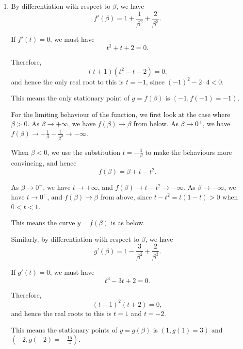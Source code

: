 \Question{\currfilebase}

\begin{enumerate}
    \item By differentiation with respect to \(\beta\), we have
          \[
              f'(\beta) = 1 + \frac{1}{\beta^2} + \frac{2}{\beta^3}.
          \]

          If \(f'(t) = 0\), we must have
          \[
              t^3 + t + 2 = 0.
          \]

          Therefore,
          \[
              (t + 1)(t^2 - t + 2) = 0,
          \]
          and hence the only real root to this is \(t = -1\), since \((-1)^2 - 2 \cdot 4 < 0\).

          This means the only stationary point of \(y = f(\beta)\) is \((-1, f(-1) = -1)\).

          For the limiting behaviour of the function, we first look at the case where \(\beta > 0\). As \(\beta \to +\infty\), we have \(f(\beta) \to \beta\) from below. As \(\beta \to 0^{+}\), we have \(f(\beta) \to -\frac{1}{\beta} - \frac{1}{\beta^2} \to -\infty\).

          When \(\beta < 0\), we use the substitution \(t = -\frac{1}{\beta}\) to make the behaviours more convincing, and hence
          \[
              f(\beta) = \beta + t - t^2.
          \]

          As \(\beta \to 0^{-}\), we have \(t \to +\infty\), and \(f(\beta) \to t - t^2 \to -\infty\). As \(\beta \to -\infty\), we have \(t \to 0^{+}\), and \(f(\beta) \to \beta\) from above, since \(t - t^2 = t (1 - t) > 0\) when \(0 < t < 1\).

          This means the curve \(y = f(\beta)\) is as below.

          \begin{center}
              
          \end{center}

          Similarly, by differentiation with respect to \(\beta\), we have
          \[
              g'(\beta) = 1 - \frac{3}{\beta^2} + \frac{2}{\beta^3}.
          \]

          If \(g'(t) = 0\), we must have
          \[
              t^3 - 3t + 2 = 0.
          \]

          Therefore,
          \[
              (t - 1)^2(t + 2) = 0,
          \]
          and hence the real roots to this is \(t = 1\) and \(t = -2\).

          This means the stationary points of \(y = g(\beta)\) is \((1, g(1) = 3)\) and \((-2, g(-2) = -\frac{15}{4})\).


\end{enumerate}
